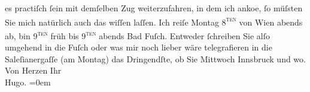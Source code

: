 \begin{ledgroupsized}[t]{13cm}
               es practiſch ſein mit demſelben {\pb}Zug weiterzufahren, in dem ich anko{\geminationm}e, ſo müſsten Sie
               mich natürlich auch das wiſſen laſſen. Ich reiſe Montag 8\textsc{\textsuperscript{ten}} von Wien abends ab, bin 9\textsc{\textsuperscript{ten}}{ }früh bis 9\textsc{\textsuperscript{ten}}{ }abends{ }Bad Fuſch. Entweder ſchreiben Sie alſo umgehend
               in die Fuſch oder was mir noch lieber wäre {\pb}telegrafieren in die Saleſianergaſſe (am Montag) das
               Dringendſte, ob Sie Mittwoch{ }Innsbruck und wo.\pend
           \pstart
           Von Herzen Ihr{\\[\baselineskip]}\spacefill\mbox{Hugo.}\pend
           \leftskip=0em{}
         
         \endnumbering{}\end{ledgroupsized}  \newcommand{\dateiname}{L00831}\newcommand{\titel}{Hugo von Hofmannsthal an Arthur Schnitzler, 6. 8. [1898]}\newcommand{\editorInnen}{Martin Anton Müller und Gerd-Hermann Susen}
      